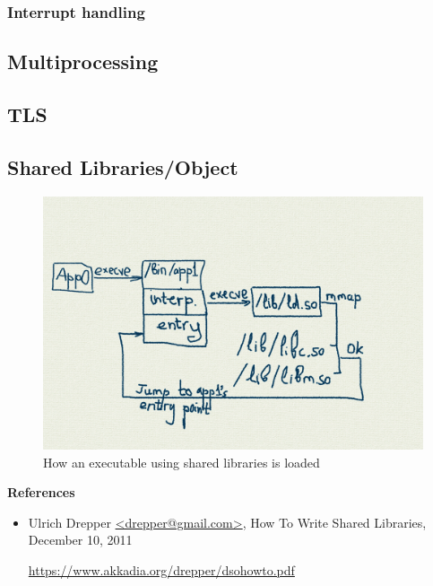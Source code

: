 \documentclass[12pt,a4paper]{article}
\begin{document}
\subsubsection{Interrupt handling}

\subsection{Multiprocessing}

\subsection{TLS}

\subsection{Shared Libraries/Object}

\begin{figure}[H]
\begin{center}
\includegraphics[width=1\textwidth]{png/ld.so.png}
\caption{How an executable using shared libraries is 
loaded}\label{fig.execve-ld.so}
\end{center}
\end{figure}

\textbf{References}

\begin{itemize}
\item Ulrich Drepper \url{<drepper@gmail.com>},
      How To Write Shared Libraries,
      December 10, 2011

      \url{https://www.akkadia.org/drepper/dsohowto.pdf}

\end{itemize}
\end{document}

